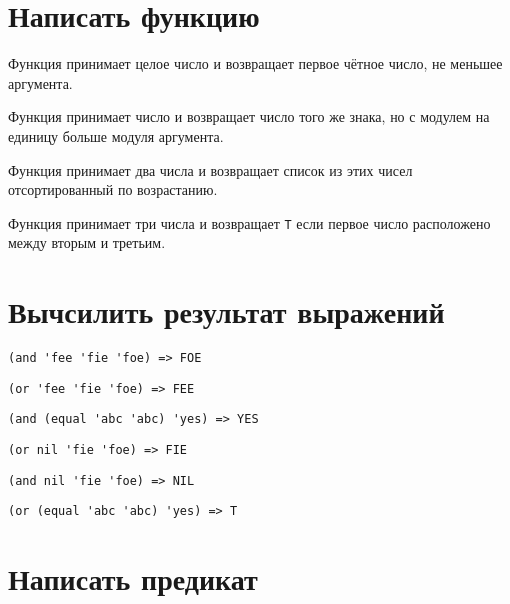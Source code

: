 
\section{Написать функцию}

\problem Функция принимает целое число и возвращает первое чётное число, не меньшее аргумента.



\problem Функция принимает число и возвращает число того же знака, но с модулем на единицу больше модуля аргумента.



\problem Функция принимает два числа и возвращает список из этих чисел отсортированный по возрастанию.



\problem Функция принимает три числа и возвращает \verb|T| если первое число расположено между вторым и третьим.




\section{Вычсилить результат выражений}

\problem \hfill
\begin{lstlisting}
(and 'fee 'fie 'foe) => FOE
\end{lstlisting}


\problem \hfill
\begin{lstlisting}
(or 'fee 'fie 'foe) => FEE
\end{lstlisting}


\problem \hfill
\begin{lstlisting}
(and (equal 'abc 'abc) 'yes) => YES
\end{lstlisting}


\problem \hfill
\begin{lstlisting}
(or nil 'fie 'foe) => FIE
\end{lstlisting}


\problem \hfill
\begin{lstlisting}
(and nil 'fie 'foe) => NIL
\end{lstlisting}


\problem \hfill
\begin{lstlisting}
(or (equal 'abc 'abc) 'yes) => T
\end{lstlisting}


\section{Написать предикат}